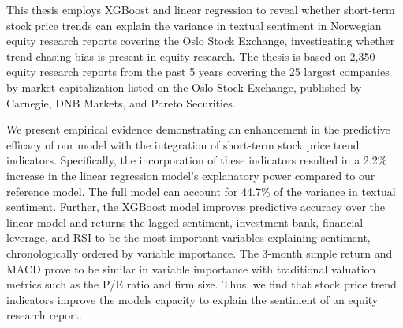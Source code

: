 





This thesis employs XGBoost and linear regression to reveal whether short-term stock price trends can explain the variance in textual sentiment in Norwegian equity research reports covering the Oslo Stock Exchange, investigating whether trend-chasing bias is present in equity research. The thesis is based on 2,350 equity research reports from the past 5 years covering the 25 largest companies by market capitalization listed on the Oslo Stock Exchange, published by Carnegie, DNB Markets, and Pareto Securities. 

We present empirical evidence demonstrating an enhancement in the predictive efficacy of our model with the integration of short-term stock price trend indicators. Specifically, the incorporation of these indicators resulted in a 2.2\% increase in the linear regression model's explanatory power compared to our reference model. The full model can account for 44.7\% of the variance in textual sentiment. Further, the XGBoost model improves predictive accuracy over the linear model and returns the lagged sentiment, investment bank, financial leverage, and RSI to be the most important variables explaining sentiment, chronologically ordered by variable importance. The 3-month simple return and MACD prove to be similar in variable importance with traditional valuation metrics such as the P/E ratio and firm size. Thus, we find that stock price trend indicators improve the models capacity to explain the sentiment of an equity research report.


